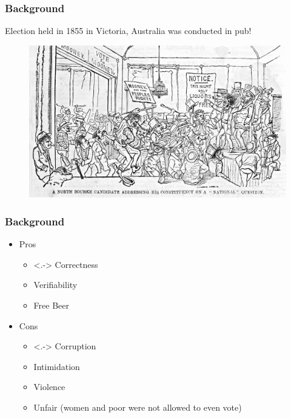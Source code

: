 \documentclass{beamer}
\begin{document}
%


\begin{frame}
\frametitle{Background}

{Election held in 1855 in Victoria, Australia 
	  was conducted in pub!}
\begin{figure}
	\begin{center}
	\includegraphics[scale=0.20]{NorthBourke.jpg}
	\end{center}
  \end{figure}   
\end{frame}

\begin{frame}
\frametitle{Background}
\begin{itemize}[]
\item Pros 
\begin{itemize}
\item<.-> Correctness
\item Verifiability
\item Free Beer
\end{itemize}
\item Cons
\begin{itemize}
\item<.-> Corruption
\item Intimidation
\item Violence
\item Unfair (women and poor were not allowed to even vote)
\end{itemize}
\end{itemize}
\end{frame}
\end{document}
